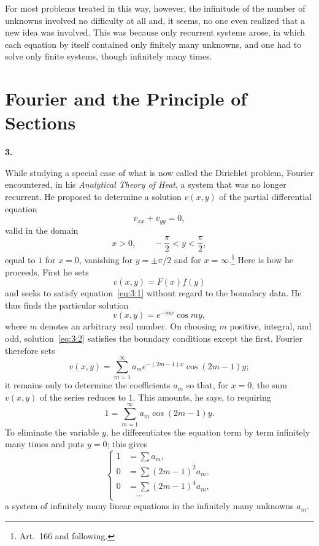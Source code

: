 \documentclass[
  paper=b5,
  fontsize=13pt,
  twoside=true,
  open=any,
  bookmarkpackage=false,
  chapterprefix=true,
  headings=normal
]{scrbook}
\theoremstyle{definition}
\newcommand{\numberedparagraph}[1]{%
  \par\medskip\phantomsection\label{sec:#1}%
  \noindent\textbf{#1.}\enspace
}
\begin{document}
For most problems treated in this way, however, the infinitude of the number of unknowns involved no difficulty at all and, it seems, no one even realized that a new idea was involved. This was because only recurrent systems arose, in which each equation by itself contained only finitely many unknowns, and one had to solve only finite systems, though infinitely many times.

\section{Fourier and the Principle of Sections}

\numberedparagraph{3}
While studying a special case of what is now called the Dirichlet problem, Fourier encountered, in his \emph{Analytical Theory of Heat}, a system that was no longer recurrent. He proposed to determine a solution $v(x,y)$ of the partial differential equation
\begin{equation}
  v_{xx}+v_{yy}=0,
  \tag{1}\label{eq:3:1}
\end{equation}
valid in the domain
\[
  x>0,\qquad -\frac{\pi}{2}<y<\frac{\pi}{2},
\]
equal to $1$ for $x=0$, vanishing for $y=\pm\pi/2$ and for $x=\infty$.\footnote{Art.~166 and following.} Here is how he proceeds. First he sets
\[
  v(x,y)=F(x)f(y)
\]
and seeks to satisfy equation~\eqref{eq:3:1} without regard to the boundary data. He thus finds the particular solution
\begin{equation}
  v(x,y)=e^{-mx}\cos my,
  \tag{2}\label{eq:3:2}
\end{equation}
where $m$ denotes an arbitrary real number. On choosing $m$ positive, integral, and odd, solution~\eqref{eq:3:2} satisfies the boundary conditions except the first. Fourier therefore sets
\[
  v(x,y)=\sum_{m=1}^{\infty}a_m e^{-(2m-1)x}\cos(2m-1)y;
\]
it remains only to determine the coefficients $a_m$ so that, for $x=0$, the sum $v(x,y)$ of the series reduces to $1$. This amounts, he says, to requiring
\begin{equation}
  1=\sum_{m=1}^{\infty}a_m\cos(2m-1)y.
  \tag{3}\label{eq:3:3}
\end{equation}
To eliminate the variable $y$, he differentiates the equation term by term infinitely many times and puts $y=0$; this gives
\begin{equation}
\left\{
\begin{aligned}
  1&=\sum a_m,\\
  0&=\sum(2m-1)^2a_m,\\
  0&=\sum(2m-1)^4a_m,\\
  &\hspace{1em}\cdots
\end{aligned}
\right.
\tag{4}\label{eq:3:4}
\end{equation}
a system of infinitely many linear equations in the infinitely many unknowns $a_m$.
\end{document}
